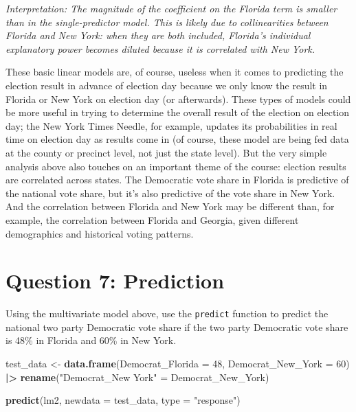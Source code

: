 \documentclass[
]{article}
\newenvironment{Shaded}{\begin{snugshade}}{\end{snugshade}}
\newcommand{\AttributeTok}[1]{\textcolor[rgb]{0.13,0.29,0.53}{#1}}
\newcommand{\DecValTok}[1]{\textcolor[rgb]{0.00,0.00,0.81}{#1}}
\newcommand{\FunctionTok}[1]{\textcolor[rgb]{0.13,0.29,0.53}{\textbf{#1}}}
\newcommand{\NormalTok}[1]{#1}
\newcommand{\OtherTok}[1]{\textcolor[rgb]{0.56,0.35,0.01}{#1}}
\newcommand{\SpecialCharTok}[1]{\textcolor[rgb]{0.81,0.36,0.00}{\textbf{#1}}}
\newcommand{\StringTok}[1]{\textcolor[rgb]{0.31,0.60,0.02}{#1}}
\begin{document}
\emph{Interpretation: The magnitude of the coefficient on the Florida
term is smaller than in the single-predictor model. This is likely due
to collinearities between Florida and New York: when they are both
included, Florida's individual explanatory power becomes diluted because
it is correlated with New York.}

These basic linear models are, of course, useless when it comes to
predicting the election result in advance of election day because we
only know the result in Florida or New York on election day (or
afterwards). These types of models could be more useful in trying to
determine the overall result of the election on election day; the New
York Times Needle, for example, updates its probabilities in real time
on election day as results come in (of course, these model are being fed
data at the county or precinct level, not just the state level). But the
very simple analysis above also touches on an important theme of the
course: election results are correlated across states. The Democratic
vote share in Florida is predictive of the national vote share, but it's
also predictive of the vote share in New York. And the correlation
between Florida and New York may be different than, for example, the
correlation between Florida and Georgia, given different demographics
and historical voting patterns.

\section{Question 7: Prediction}\label{question-7-prediction}

Using the multivariate model above, use the \texttt{predict} function to
predict the national two party Democratic vote share if the two party
Democratic vote share is 48\% in Florida and 60\% in New York.

\begin{Shaded}
\begin{Highlighting}[]
\NormalTok{test\_data }\OtherTok{\textless{}{-}} \FunctionTok{data.frame}\NormalTok{(}\AttributeTok{Democrat\_Florida =} \DecValTok{48}\NormalTok{, }\AttributeTok{Democrat\_New\_York =} \DecValTok{60}\NormalTok{) }\SpecialCharTok{|\textgreater{}}
  \FunctionTok{rename}\NormalTok{(}\StringTok{"Democrat\_New York"} \OtherTok{=}\NormalTok{ Democrat\_New\_York)}

\FunctionTok{predict}\NormalTok{(lm2, }\AttributeTok{newdata =}\NormalTok{ test\_data, }\AttributeTok{type =} \StringTok{"response"}\NormalTok{)}
\end{Highlighting}
\end{Shaded}
\end{document}
